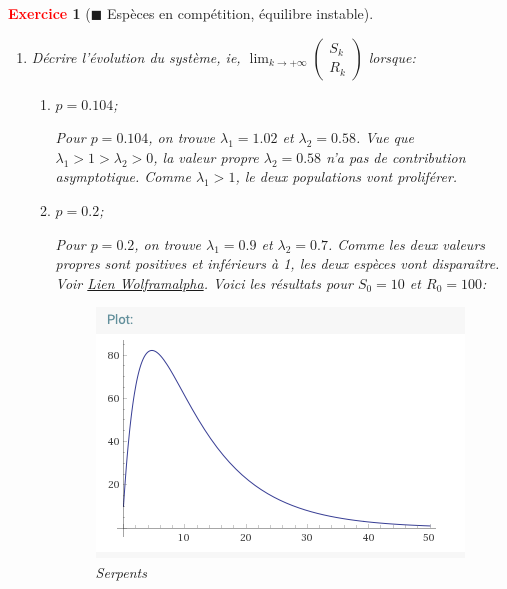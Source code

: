 \documentclass[11pt]{article}
\theoremstyle{mythmstyle}
\newtheorem{exo}{\textcolor{red}{\textbf{Exercice}}}
\newcommand{\R}{\mathbb{R}}
\begin{document}
\begin{exo}[$\blacksquare$ Espèces en compétition, équilibre instable]
\begin{enumerate}
\begin{solution}
    $$\Delta=(-1.6)^2 - 4.(0.55+0.4p)=0.36 - 1.6p$$ 
    
    Donc pour avoir des valeurs propres réels il faut que 
    
    $$
    0.36-1.6p>0 \Leftrightarrow 1.6p<0.36 \Leftrightarrow p< 0.225
    $$
    Donc $\lambda_1= \frac{1.6+ \sqrt{0.36-1.6p}}{2}$ et $\lambda_2=\frac{1.6- \sqrt{0.36-1.6p}}{2}$.
\end{solution}
    \item Décrire l’évolution du système, ie, $\lim_{k\to+\infty} \begin{pmatrix}S_k\\R_k\end{pmatrix}$ lorsque:
\begin{enumerate}    
     \item $p=0.104$;
\begin{solution}
    Pour $p=0.104$, on trouve $\lambda_1= 1.02$ et $\lambda_2=0.58$. Vue que $\lambda_1>1>\lambda_2>0$,
    la valeur propre $\lambda_2=0.58$ n'a pas de contribution asymptotique. Comme $\lambda_1>1$, le deux populations vont proliférer.
\end{solution}
    \item $p=0.2$;
\begin{solution}
    Pour $p=0.2$, on trouve $\lambda_1= 0.9$ et $\lambda_2=0.7$. Comme les deux valeurs propres sont positives et inférieurs à 1, 
les deux espèces vont disparaître. Voir 
\href{https://www.wolframalpha.com/input/?i=u%28n%2B1%29%3D0.5*u%28n%29%2B0.4*v%28n%29%2C+v%28n%2B1%29%3D-0.2*u%28n%29%2B%281.1%29*v%28n%29}{Lien Wolframalpha}. 
Voici les résultats pour $S_0=10$ et $R_0=100$:

\begin{figure}[H]
\begin{center}
\includegraphics[scale=0.5]{serpentsp02.png}
\caption{Serpents}
\end{center}
\end{figure}
        

\end{solution}
\end{enumerate}
\end{enumerate}
\end{exo}
\end{document}
